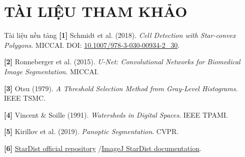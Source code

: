 \documentclass[aspectratio=169,11pt]{beamer}
\begin{document}
\appendix
\section{TÀI LIỆU THAM KHẢO}
\begin{frame}{Tài liệu nền tảng}
\small
\textbf{[1]} Schmidt et al. (2018). \emph{Cell Detection with Star-convex Polygons}. MICCAI. DOI: \href{https://doi.org/10.1007/978-3-030-00934-2_30}{10.1007/978-3-030-00934-2\_30}.
\par\textbf{[2]} Ronneberger et al. (2015). \emph{U-Net: Convolutional Networks for Biomedical Image Segmentation}. MICCAI.
\par\textbf{[3]} Otsu (1979). \emph{A Threshold Selection Method from Gray-Level Histograms}. IEEE TSMC.
\par\textbf{[4]} Vincent \& Soille (1991). \emph{Watersheds in Digital Spaces}. IEEE TPAMI.
\par\textbf{[5]} Kirillov et al. (2019). \emph{Panoptic Segmentation}. CVPR.
\par\textbf{[6]} \href{https://github.com/stardist/stardist}{StarDist official repository} \enspace /\enspace \href{https://imagej.net/plugins/stardist}{ImageJ StarDist documentation}.
\end{frame}
\end{document}

